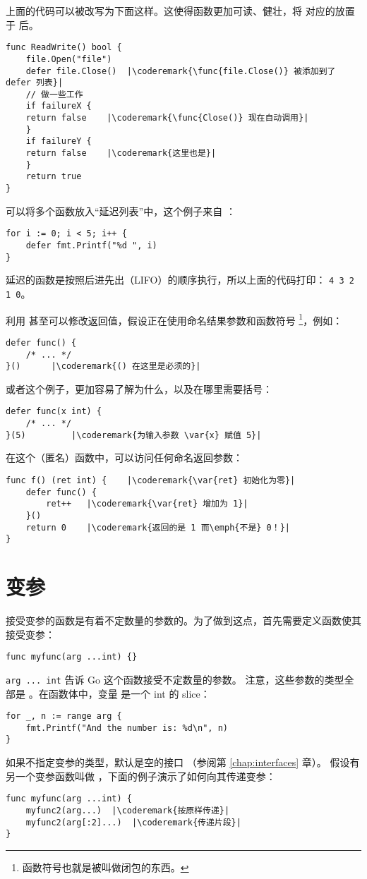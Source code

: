 上面的代码可以被改写为下面这样。这使得函数更加可读、健壮，将
 对应的放置于  后。
\begin{lstlisting}[caption=With defer]
func ReadWrite() bool {
    file.Open("file")
    defer file.Close()	|\coderemark{\func{file.Close()} 被添加到了 defer 列表}|
    // 做一些工作
    if failureX {
	return false    |\coderemark{\func{Close()} 现在自动调用}|
    }
    if failureY {
	return false    |\coderemark{这里也是}|
    }
    return true
}
\end{lstlisting}

可以将多个函数放入``延迟列表''中，这个例子来自 \cite{effective_go}：
\begin{lstlisting}
for i := 0; i < 5; i++ { 
    defer fmt.Printf("%d ", i) 
} 
\end{lstlisting}
延迟的函数是按照后进先出（LIFO）的顺序执行，所以上面的代码打印：
\lstinline{4 3 2 1 0}。

利用  甚至可以修改返回值，假设正在使用命名结果参数和函数符号
\footnote{函数符号也就是被叫做闭包的东西。}，例如：
\begin{lstlisting}[caption=函数符号]
defer func() {
	/* ... */
}()		 |\coderemark{() 在这里是必须的}|
\end{lstlisting}
或者这个例子，更加容易了解为什么，以及在哪里需要括号：
\begin{lstlisting}[caption=带参数的函数符号]
defer func(x int) {
	/* ... */
}(5)		 |\coderemark{为输入参数 \var{x} 赋值 5}|
\end{lstlisting}
在这个（匿名）函数中，可以访问任何命名返回参数：
\begin{lstlisting}[caption=在 defer 中访问返回值]
func f() (ret int) {    |\coderemark{\var{ret} 初始化为零}|
	defer func() {
		ret++	|\coderemark{\var{ret} 增加为 1}|
	}()
	return 0	|\coderemark{返回的是 1 而\emph{不是} 0！}|
}
\end{lstlisting}

\section{变参}
接受变参的函数是有着不定数量的参数的。为了做到这点，首先需要定义函数使其接受变参：
\begin{lstlisting}
func myfunc(arg ...int) {}
\end{lstlisting}
\lstinline{arg ... int} 告诉 Go 这个函数接受不定数量的参数。
注意，这些参数的类型全部是 。在函数体中，变量
 是一个 int 的 slice：
\begin{lstlisting}
for _, n := range arg {
    fmt.Printf("And the number is: %d\n", n)
}
\end{lstlisting}
如果不指定变参的类型，默认是空的接口  （参阅第 \ref{chap:interfaces} 章）。
假设有另一个变参函数叫做 ，下面的例子演示了如何向其传递变参：
\begin{lstlisting}
func myfunc(arg ...int) {
    myfunc2(arg...)  |\coderemark{按原样传递}|
    myfunc2(arg[:2]...)  |\coderemark{传递片段}|
}
\end{lstlisting}

